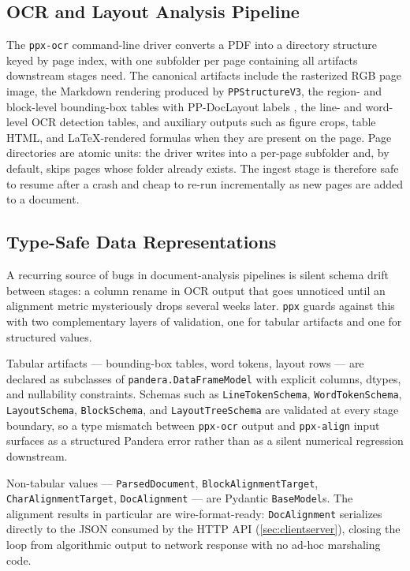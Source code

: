 \documentclass{article}
\theoremstyle{definition}
\begin{document}
\subsection{OCR and Layout Analysis Pipeline}
\label{sec:pipeline}

The \texttt{ppx-ocr} command-line driver \cite{PaddleOCR30} converts
a PDF into a directory structure keyed by page index, with one
subfolder per page containing all artifacts downstream stages need.
The canonical artifacts include the rasterized RGB page image, the
Markdown rendering produced by \texttt{PPStructureV3}, the
region- and block-level bounding-box tables with PP-DocLayout
labels \cite{PPDocLayout}, the line- and word-level OCR detection
tables, and auxiliary outputs such as figure crops, table HTML, and
LaTeX-rendered formulas when they are present on the page.
Page directories are atomic units: the driver writes into a per-page
subfolder and, by default, skips pages whose folder already exists.
The ingest stage is therefore safe to resume after a crash and
cheap to re-run incrementally as new pages are added to a
document.

\subsection{Type-Safe Data Representations}
\label{sec:types}

A recurring source of bugs in document-analysis pipelines is silent
schema drift between stages: a column rename in OCR output that
goes unnoticed until an alignment metric mysteriously drops several
weeks later.  \texttt{ppx} guards against this with two
complementary layers of validation, one for tabular artifacts and
one for structured values.

Tabular artifacts --- bounding-box tables, word tokens, layout rows
--- are declared as subclasses of \texttt{pandera.DataFrameModel}
with explicit columns, dtypes, and nullability constraints.  Schemas
such as \texttt{LineTokenSchema}, \texttt{WordTokenSchema},
\texttt{LayoutSchema}, \texttt{BlockSchema}, and
\texttt{LayoutTreeSchema} are validated at every stage boundary, so
a type mismatch between \texttt{ppx-ocr} output and
\texttt{ppx-align} input surfaces as a structured Pandera error
rather than as a silent numerical regression downstream.

Non-tabular values --- \texttt{ParsedDocument},
\texttt{BlockAlignmentTarget}, \texttt{CharAlignmentTarget},
\texttt{DocAlignment} --- are Pydantic \texttt{BaseModel}s.  The
alignment results in particular are wire-format-ready:
\texttt{DocAlignment} serializes directly to the JSON consumed by
the HTTP API (\cref{sec:clientserver}), closing the loop from
algorithmic output to network response with no ad-hoc marshaling
code.
\end{document}
